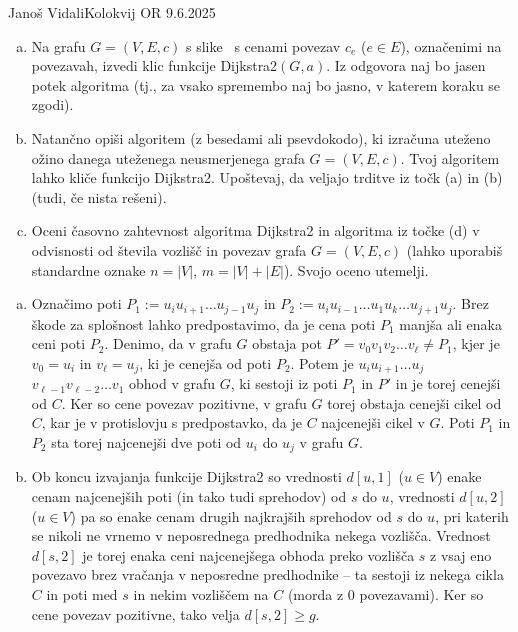 \begin{naloga}{Janoš Vidali}{Kolokvij OR 9.6.2025}
\begin{vprasanje}
\begin{enumerate}[(a)]
\item Na grafu $G = (V, E, c)$ s slike~\fig
s cenami povezav $c_e$ ($e \in E$), označenimi na povezavah,
izvedi klic funkcije {\sc Dijkstra2}$(G, a)$.
Iz odgovora naj bo jasen potek algoritma
(tj., za vsako spremembo naj bo jasno, v katerem koraku se zgodi).

\item Natančno opiši algoritem (z besedami ali psevdokodo),
ki izračuna uteženo ožino danega uteženega neusmerjenega grafa $G = (V, E, c)$.
Tvoj algoritem lahko kliče funkcijo {\sc Dijkstra2}.
Upoštevaj, da veljajo trditve iz točk (a) in (b)
(tudi, če nista rešeni).

\item Oceni časovno zahtevnost algoritma {\sc Dijkstra2}
in algoritma iz točke (d)
v odvisnosti od števila vozlišč in povezav grafa $G = (V, E, c)$
(lahko uporabiš standardne oznake $n = |V|$, $m = |V| + |E|$).
Svojo oceno utemelji.
\end{enumerate}

\begin{slika}
\pgfslika
{}
\end{slika}
\end{vprasanje}

\begin{odgovor}
\begin{enumerate}[(a)]
\item Označimo poti $P_1 := u_i u_{i+1} \dots u_{j-1} u_j$
in $P_2 := u_i u_{i-1} \dots u_1 u_k \dots u_{j+1} u_j$.
Brez škode za splošnost lahko predpostavimo,
da je cena poti $P_1$ manjša ali enaka ceni poti $P_2$.
Denimo, da v grafu $G$ obstaja pot $P' = v_0 v_1 v_2 \dots v_\ell \ne P_1$,
kjer je $v_0 = u_i$ in $v_\ell = u_j$, ki je cenejša od poti $P_2$.
Potem je $u_i u_{i+1} \dots u_j$ $v_{\ell-1} v_{\ell-2} \dots v_1$
obhod v grafu $G$,
ki sestoji iz poti $P_1$ in $P'$ in je torej cenejši od $C$.
Ker so cene povezav pozitivne,
v grafu $G$ torej obstaja cenejši cikel od $C$,
kar je v protislovju s predpostavko, da je $C$ najcenejši cikel v $G$.
Poti $P_1$ in $P_2$ sta torej najcenejši dve poti
od $u_i$ do $u_j$ v grafu $G$.

\item Ob koncu izvajanja funkcije {\sc Dijkstra2}
so vrednosti $d[u, 1]$ ($u \in V$)
enake cenam najcenejših poti (in tako tudi sprehodov) od $s$ do $u$,
vrednosti $d[u, 2]$ ($u \in V$)
pa so enake cenam drugih najkrajših sprehodov od $s$ do $u$,
pri katerih se nikoli ne vrnemo v neposrednega predhodnika nekega vozlišča.
Vrednost $d[s, 2]$ je torej enaka ceni
najcenejšega obhoda preko vozlišča $s$ z vsaj eno povezavo
brez vračanja v neposredne predhodnike
-- ta sestoji iz nekega cikla $C$
in poti med $s$ in nekim vozliščem na $C$ (morda z $0$ povezavami).
Ker so cene povezav pozitivne, tako velja $d[s, 2] \ge g$.


\end{enumerate}
\end{odgovor}
\end{naloga}
